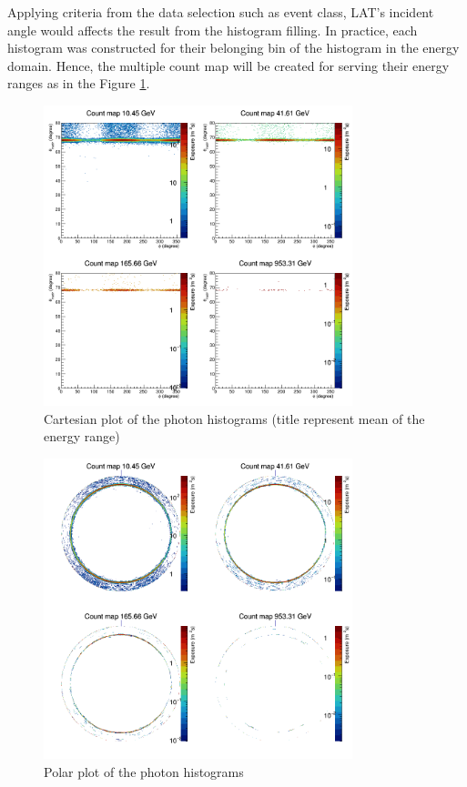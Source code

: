 Applying criteria from the data selection such as event class, LAT's 
incident angle would affects the result from the histogram filling.
In practice, each histogram was constructed for their belonging bin 
of the histogram in the energy domain. Hence, the multiple count map 
will be created for serving their energy ranges as in the
Figure \ref{fig:cntmap_cartesian}.

\begin{figure}[h!]
    \centering
    \includegraphics[width=0.8\textwidth]{content/result_and_discussion/figures/cartesian_cntmaps.png}
    \caption{Cartesian plot of the photon histograms (title represent mean of the energy range)}
    \label{fig:cntmap_cartesian}
\end{figure}


\begin{figure}[h!]
    \centering
    \includegraphics[width=0.8\textwidth]{content/result_and_discussion/figures/polar_cntmaps.png}
    \caption{Polar plot of the photon histograms}
    \label{fig:cntmap_polar}
\end{figure}


